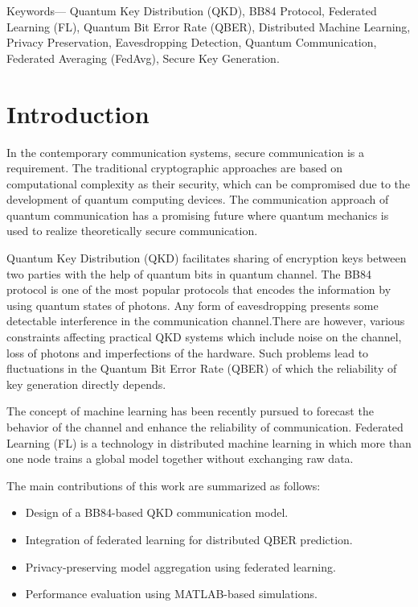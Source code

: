 \documentclass[conference]{IEEEtran}
\begin{document}
Keywords— Quantum Key Distribution (QKD), BB84 Protocol, Federated Learning (FL), Quantum Bit Error Rate (QBER), Distributed Machine Learning, Privacy Preservation, Eavesdropping Detection, Quantum Communication, Federated Averaging (FedAvg), Secure Key Generation.


\section{Introduction}

In the contemporary communication systems, secure communication is a requirement. The traditional cryptographic approaches are based on computational complexity as their security, which can be compromised due to the development of quantum computing devices. The communication approach of quantum communication has a promising future where quantum mechanics is used to realize theoretically secure communication.

Quantum Key Distribution (QKD) facilitates sharing of encryption keys between two parties with the help of quantum bits in quantum channel. The BB84 protocol is one of the most popular protocols that encodes the information by using quantum states of photons. Any form of eavesdropping presents some detectable interference in the communication channel.There are however, various constraints affecting practical QKD systems which include noise on the channel, loss of photons and imperfections of the hardware. Such problems lead to fluctuations in the Quantum Bit Error Rate (QBER) of which the reliability of key generation directly depends.

The concept of machine learning has been recently pursued to forecast the behavior of the channel and enhance the reliability of communication. Federated Learning (FL) is a technology in distributed machine learning in which more than one node trains a global model together without exchanging raw data.

The main contributions of this work are summarized as follows:

\begin{itemize}

\item Design of a BB84-based QKD communication model.

\item Integration of federated learning for distributed QBER prediction.

\item Privacy-preserving model aggregation using federated learning.

\item Performance evaluation using MATLAB-based simulations.

\end{itemize}
\end{document}
